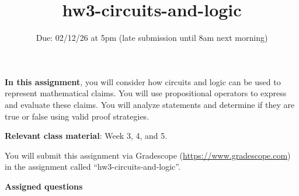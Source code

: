 

\title{hw3-circuits-and-logic}
\date{Due: 02/12/26 at 5pm (late submission until 8am next morning)}

\maketitle
\thispagestyle{fancy}

{\bf In this assignment}, you will consider how circuits and logic can be used to represent
mathematical claims. You will use propositional operators
to express and evaluate these claims.  You will analyze statements and determine if they are true or false using valid proof strategies.

{\bf Relevant class material}: Week 3, 4, and 5.

You will submit this assignment via Gradescope
(\href{https://www.gradescope.com}{https://www.gradescope.com}) 
in the assignment called ``hw3-circuits-and-logic''.

\instructions

{\bf Assigned questions}

